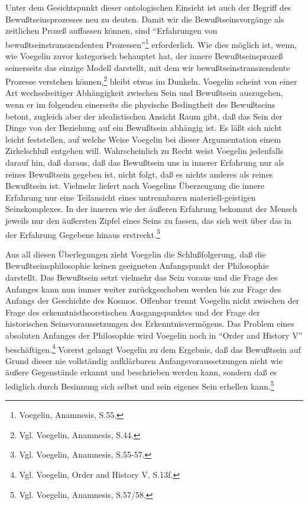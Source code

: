 Unter dem Gesichtspunkt dieser ontologischen Einsicht ist auch der Begriff des
Bewußtseinsprozesses neu zu deuten. Damit wir die Bewußtseinsvorgänge als
zeitlichen Prozeß auffassen können, sind "`Erfahrungen von
bewußtseinstranszendenten Prozessen"'\footnote{Voegelin, Anamnesis, S.55.}
erforderlich. Wie dies möglich ist, wenn, wie Voegelin zuvor kategorisch
behauptet hat, der innere Bewußtseinsprozeß seinerseits das einzige Modell
darstellt, mit dem wir bewußtseinstranszendente Prozesse verstehen
können,\footnote{Vgl. Voegelin, Anamnesis, S.44.} bleibt etwas im Dunkeln.
Voegelin scheint von einer Art wechselseitiger Abhängigkeit zwischen Sein und
Bewußtsein auszugehen, wenn er im folgenden einerseits die physische
Bedingtheit des Bewußtseins betont, zugleich aber der idealistischen Ansicht
Raum gibt, daß das Sein der Dinge von der Beziehung auf ein Bewußtsein
abhängig ist. Es läßt sich nicht leicht feststellen, auf welche Weise Voegelin
bei dieser Argumentation einem Zirkelschluß entgehen will. Wahrscheinlich zu
Recht weist Voegelin jedenfalls darauf hin, daß daraus, daß das Bewußtsein uns
in innerer Erfahrung nur als reines Bewußtsein gegeben ist, nicht folgt, daß
es nichts anderes als reines Bewußtsein ist. Vielmehr liefert nach Voegelins
Überzeugung die innere Erfahrung nur eine Teilansicht eines untrennbaren
materiell-geistigen Seinskomplexes. In der inneren wie der äußeren Erfahrung
bekommt der Mensch jeweils nur den äußersten Zipfel eines Seins zu fassen, das
sich weit über das in der Erfahrung Gegebene hinaus erstreckt.\footnote{Vgl.
  Voegelin, Anamnesis, S.55-57.}

Aus all diesen Überlegungen zieht Voegelin die Schlußfolgerung, daß die
Bewußtseinsphilosophie keinen geeigneten Anfangspunkt der Philosophie
darstellt. Das Bewußtsein setzt vielmehr das Sein voraus und die Frage des
Anfanges kann nun immer weiter zurückgeschoben werden bis zur Frage des
Anfangs der Geschichte des Kosmos. Offenbar trennt Voegelin nicht zwischen der
Frage des erkenntnistheoretischen Ausgangspunktes und der Frage der
historischen Seinsvoraussetzungen des Erkenntnisvermögens. Das
Problem eines absoluten Anfanges der Philosophie wird Voegelin noch in "`Order
and History V"' beschäftigen.\footnote{Vgl. Voegelin, Order and History V,
  S.13f.}  Vorerst gelangt Voegelin zu dem Ergebnis, daß das Bewußtsein auf
Grund dieser nie vollständig aufklärbaren Anfangsvoraussetzungen nicht wie
äußere Gegenstände erkannt und beschrieben werden kann, sondern daß es
lediglich durch Besinnung sich selbst und sein eigenes Sein erhellen
kann.\footnote{Vgl.  Voegelin, Anamnesis, S.57/58.}

